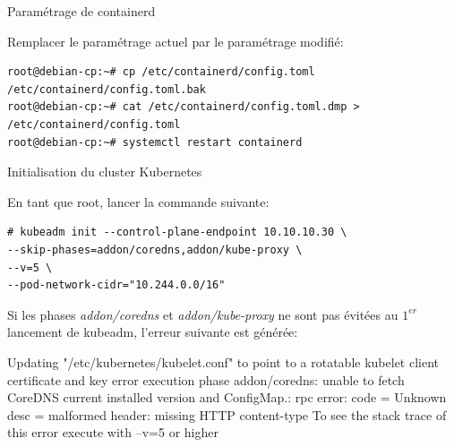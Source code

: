 
\begin{frame}[fragile]{Paramétrage de containerd}

Remplacer le paramétrage actuel par le paramétrage modifié:

\begin{tiny}
\begin{Verbatim}[commandchars=\\\{\}]
root@debian-cp:~# cp /etc/containerd/config.toml /etc/containerd/config.toml.bak
root@debian-cp:~# cat /etc/containerd/config.toml.dmp > /etc/containerd/config.toml
root@debian-cp:~# systemctl restart containerd
\end{Verbatim}
\end{tiny}

\end{frame}


\begin{frame}[fragile]{Initialisation du cluster Kubernetes}

En tant que root, lancer la commande suivante:

\begin{tiny}
\begin{Verbatim}[commandchars=\&\@\@]
# kubeadm init --control-plane-endpoint 10.10.10.30 \
--skip-phases=addon/coredns,addon/kube-proxy \
--v=5 \
--pod-network-cidr="10.244.0.0/16"
\end{Verbatim}
\end{tiny}

Si les phases \textit{addon/coredns} et \textit{addon/kube-proxy} ne sont pas évitées au $1^{er}$ lancement de kubeadm, l'erreur suivante est générée:

\begin{toile}
[kubelet-finalize] Updating "/etc/kubernetes/kubelet.conf" to point to a rotatable kubelet client certificate and key
error execution phase addon/coredns: unable to fetch CoreDNS current installed version and ConfigMap.: rpc error: code = Unknown desc = malformed header: missing HTTP content-type
To see the stack trace of this error execute with --v=5 or higher
\end{toile}

\end{frame}


